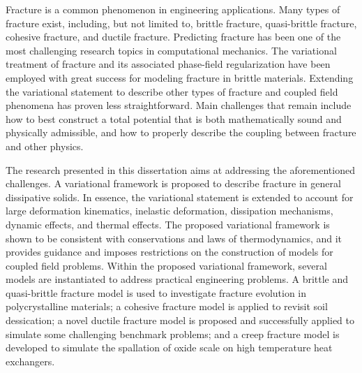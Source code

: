 \abstract

Fracture is a common phenomenon in engineering applications. Many types of fracture exist, including, but not limited to, brittle fracture, quasi-brittle fracture, cohesive fracture, and ductile fracture. Predicting fracture has been one of the most challenging research topics in computational mechanics. The variational treatment of fracture and its associated phase-field regularization have been employed with great success for modeling fracture in brittle materials. Extending the variational statement to describe other types of fracture and coupled field phenomena has proven less straightforward. Main challenges that remain include how to best construct a total potential that is both mathematically sound and physically admissible, and how to properly describe the coupling between fracture and other physics.

The research presented in this dissertation aims at addressing the aforementioned challenges. A variational framework is proposed to describe fracture in general dissipative solids. In essence, the variational statement is extended to account for large deformation kinematics, inelastic deformation, dissipation mechanisms, dynamic effects, and thermal effects. The proposed variational framework is shown to be consistent with conservations and laws of thermodynamics, and it provides guidance and imposes restrictions on the construction of models for coupled field problems. Within the proposed variational framework, several models are instantiated to address practical engineering problems. A brittle and quasi-brittle fracture model is used to investigate fracture evolution in polycrystalline materials; a cohesive fracture model is applied to revisit soil dessication; a novel ductile fracture model is proposed and successfully applied to simulate some challenging benchmark problems; and a creep fracture model is developed to simulate the spallation of oxide scale on high temperature heat exchangers.
